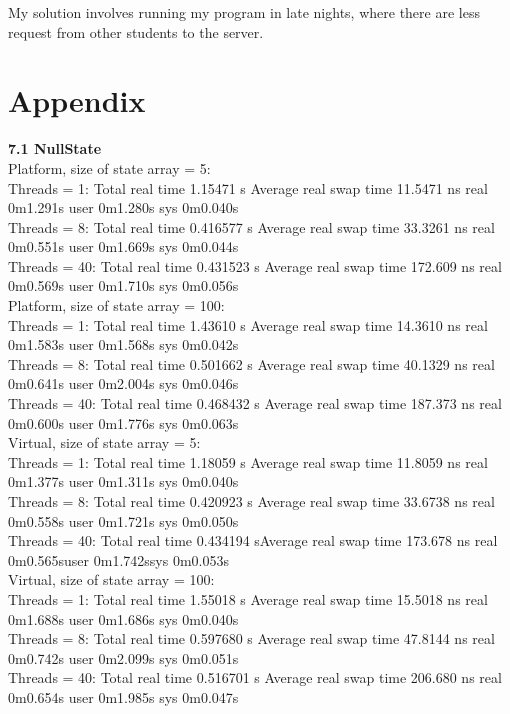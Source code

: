 \documentclass[letterpaper,twocolumn,10pt]{article}
\begin{document}
\noindent My solution involves running my program in late nights,
where there are less request from other students to the server.

\pagebreak

\section{Appendix}

\textbf{7.1 NullState}\\

\noindent Platform, size of state array = 5:\\
Threads = 1: Total real time 1.15471 s Average real swap time 11.5471 ns real  0m1.291s user  0m1.280s sys     0m0.040s\\
Threads = 8: Total real time 0.416577 s Average real swap time 33.3261 ns real  0m0.551s user  0m1.669s sys   0m0.044s\\
Threads = 40: Total real time 0.431523 s
Average real swap time 172.609 ns
real    0m0.569s
user    0m1.710s
sys     0m0.056s\\

\noindent Platform, size of state array = 100:\\
Threads = 1: Total real time 1.43610 s
Average real swap time 14.3610 ns
real    0m1.583s
user    0m1.568s
sys     0m0.042s\\
Threads = 8: Total real time 0.501662 s
Average real swap time 40.1329 ns
real    0m0.641s
user    0m2.004s
sys     0m0.046s\\
Threads = 40: Total real time 0.468432 s
Average real swap time 187.373 ns
real    0m0.600s
user    0m1.776s
sys     0m0.063s\\

\noindent Virtual, size of state array = 5:\\
Threads = 1: Total real time 1.18059 s Average real swap time 11.8059 ns real    0m1.377s user    0m1.311s sys   0m0.040s\\
Threads = 8: Total real time 0.420923 s Average real swap time 33.6738 ns real  0m0.558s user  0m1.721s sys    0m0.050s\\
Threads = 40: Total real time 0.434194 sAverage real swap time 173.678 ns real 0m0.565suser  0m1.742ssys     0m0.053s\\

\noindent Virtual, size of state array = 100:\\
Threads = 1: Total real time 1.55018 s Average real swap time 15.5018 ns real    0m1.688s user  0m1.686s sys     0m0.040s\\
Threads = 8: Total real time 0.597680 s Average real swap time 47.8144 ns real  0m0.742s user  0m2.099s sys    0m0.051s\\
Threads = 40: Total real time 0.516701 s Average real swap time 206.680 ns real 0m0.654s user  0m1.985s sys   0m0.047s\\
\end{document}
